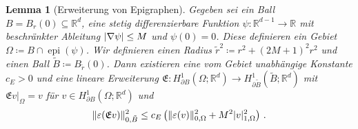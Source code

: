 \documentclass{scrartcl}
\newcounter{everything}
\newtheorem{lemma}[everything]{Lemma}
\def\R{\mathbb{R}}
\def\e{\varepsilon}
\newcommand{\tir}{\tilde{r}}
\newcommand{\tiB}{\tilde{B}}
\newcommand{\erw}{\mathfrak{E}}			%
\DeclareMathOperator{\epi}{epi}			%
\DeclarePairedDelimiter{\abs}{\lvert}{\rvert}
\DeclarePairedDelimiter{\norm}{\lVert}{\rVert}
\begin{document}
\begin{lemma}[Erweiterung von Epigraphen]\label{le:ErweiterungVonEpigraphen}
	Gegeben sei ein Ball $B=B_r(0)\subseteq\R^d$, eine stetig differenzierbare Funktion $\psi\colon\R^{d-1}\to\R$ mit beschränkter Ableitung $\abs{\nabla\psi}\leq M$ und $\psi(0)=0$. Diese definieren ein Gebiet $\Omega\coloneqq B\cap\epi(\psi)$. Wir definieren einen Radius $\tir^2\coloneqq r^2+(2M+1)^2r^2$ und einen Ball $\tiB\coloneqq B_{\tir}(0)$. Dann existieren eine vom Gebiet unabhängige Konstante $c_{E}>0$ und eine lineare Erweiterung $\erw \colon H^1_{\partial B}(\Omega;\R^d)\to H^1_{\partial \tiB}(\tiB;\R^d)$ mit $\erw v\vert_\Omega = v$ für $v\in H^1_{\partial B}(\Omega;\R^d)$ und
	\begin{align}
		\norm{\e(\erw v)}_{0,\tiB}^2 \leq c_{E}\left(\norm{\e(v)}_{0,\Omega}^2+M^2\abs{v}_{1,\Omega}^2\right)\,. \label{eq:ErweiterungEpigraphenUngleichung1}
	\end{align}
\end{lemma}
\end{document}
